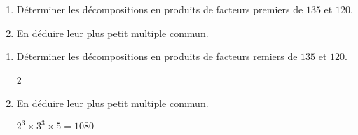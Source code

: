 \begin{exercice*}
    \begin{enumerate}
        \item Déterminer les décompositions en produits de facteurs premiers de $135$ et $120$.
        \item En déduire leur plus petit multiple commun.
    \end{enumerate}    
\end{exercice*}
\begin{corrige}
    \begin{enumerate}
        \item Déterminer les décompositions en produits de facteurs remiers de $135$ et $120$.
        
        \begin{multicols}2        
        \columnbreak
        \end{multicols}
        \item En déduire leur plus petit multiple commun.
        
        $2^3\times 3^3\times 5=\num{1080}$
    \end{enumerate}    

\end{corrige}

